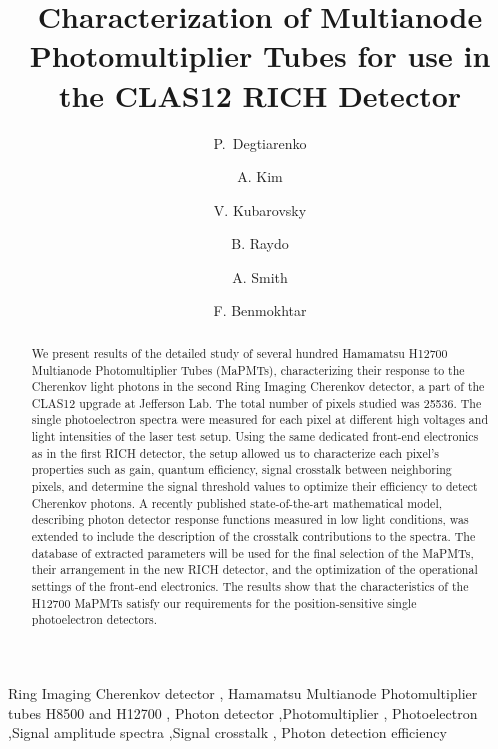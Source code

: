 \documentclass[final,5p,times,twocolumn]{elsarticle}
\begin{document}
\begin{frontmatter}
\title{Characterization of Multianode Photomultiplier Tubes for use in the CLAS12 RICH Detector}

\author[A]{P.~Degtiarenko }
\author[B]{A. Kim } 
\author[A]{V. Kubarovsky }
\author[A]{B. Raydo}
\author[C]{A. Smith}
\author[D]{F. Benmokhtar}



\address[A]{Thomas Jefferson National Accelerator Facility, Newport News, VA 23606, USA}
\address[B]{University of Connecticut, Storrs, CT 06269, USA}
\address[C]{Duke University, Durham, NC 27705, USA}
\address[D]{Duquesne University, Pittsburgh, PA, 15282, USA}



\begin{abstract}
We present results of the detailed study of several hundred Hamamatsu H12700 Multianode Photomultiplier Tubes (MaPMTs), characterizing their response to the Cherenkov light photons in the second Ring Imaging Cherenkov detector, a part of the CLAS12 upgrade at Jefferson Lab.
The total number of pixels studied was 25536.
The single photoelectron spectra were measured for each pixel at different high voltages and  light intensities of the laser test setup. Using the same dedicated front-end electronics as in the first RICH detector, the setup allowed us to characterize each pixel's properties such as gain, quantum efficiency, signal crosstalk between neighboring pixels,
and determine the signal threshold values to optimize their efficiency to detect Cherenkov photons.
A recently published state-of-the-art mathematical model, describing photon detector response functions measured in low light conditions, was extended to include the description of the crosstalk contributions to the spectra.
The database of extracted parameters will be used for the final selection of the MaPMTs, their arrangement in the new RICH detector, and the optimization of the operational settings of the front-end electronics.
The results show that the characteristics of the H12700 MaPMTs satisfy our requirements for the position-sensitive single photoelectron detectors.
\end{abstract}

\begin{keyword}
Ring Imaging Cherenkov detector \sep
Hamamatsu Multianode Photomultiplier tubes H8500 and H12700 \sep
Photon detector \sep Photomultiplier \sep
Photoelectron \sep  Signal amplitude spectra \sep Signal crosstalk \sep
Photon detection efficiency
\end{keyword}


\end{frontmatter}
\end{document}
